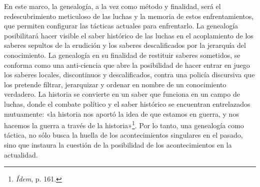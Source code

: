 En este marco, la genealogía, a la vez como método y finalidad, será el redescubrimiento meticuloso de las luchas y la memoria de estos enfrentamientos, que permiten configurar las tácticas actuales para enfrentarlo. La genealogía posibilitará hacer visible el saber histórico de las luchas en el acoplamiento de los saberes sepultos de la erudi­ción y los saberes descalificados por la jerarquía del cono­cimiento. La genealogía en su finalidad de restituir saberes sometidos, se conforma como una anti-ciencia que abre la posibilidad de hacer entrar en juego los saberes locales, discontinuos y descalificados, contra una policía discursiva que los pretende filtrar, jerarquizar y ordenar en nombre de un conocimiento verdadero. La historia se convierte en un saber que funciona en un campo de luchas, donde el combate político y el saber histórico se encuentran entrelazados mutuamente: «la historia nos aportó la idea de que estamos en guerra, y nos hacemos la guerra a través de la historia»\footnote{\emph{Ídem}, p. 161.}. Por lo tanto, una genealogía como táctica, no sólo busca la huella de los acontecimientos singulares en el pasado, sino que instaura la cuestión de la posibilidad de los acontecimientos en la actualidad.

